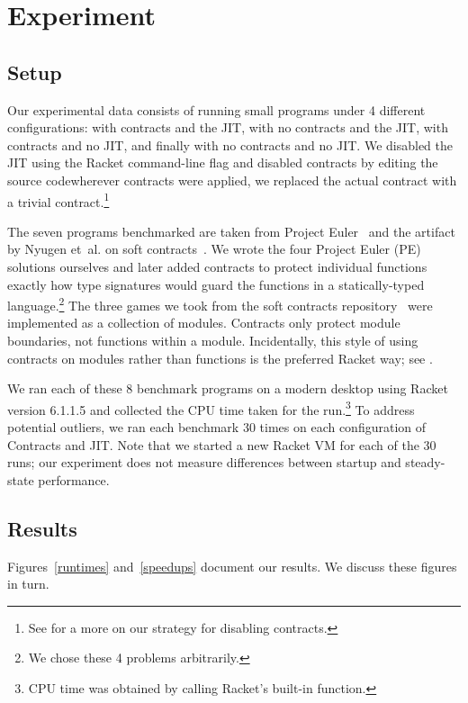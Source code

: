 \section{Experiment}
\label{experiment}
\subsection{Setup}
Our experimental data consists of running small programs under 4 different configurations: with contracts and the JIT, with no contracts and the JIT, with contracts and no JIT, and finally with no contracts and no JIT.
We disabled the JIT using the Racket command-line flag  and disabled contracts by editing the  source code\textemdash wherever contracts were applied, we replaced the actual contract with a trivial  contract.\footnote{See  for a more on our strategy for disabling contracts.}

The seven programs benchmarked are taken from Project Euler~\cite{project-euler} and the artifact by Nyugen et~al. on soft contracts~\cite{soft-contracts}.
We wrote the four Project Euler (PE) solutions ourselves and later added contracts to protect individual functions exactly how type signatures would guard the functions in a statically-typed language.\footnote{We chose these 4 problems arbitrarily.}
The three games we took from the soft contracts repository~\cite{soft-contracts-repo} were implemented as a collection of modules.
Contracts only protect module boundaries, not functions within a module.
Incidentally, this style of using contracts on modules rather than functions is the preferred Racket way; see .

We ran each of these 8 benchmark programs on a modern desktop using Racket version 6.1.1.5 and collected the CPU time taken for the run.\footnote{CPU time was obtained by calling Racket's built-in  function.}
To address potential outliers, we ran each benchmark 30 times on each configuration of Contracts and JIT.
Note that we started a new Racket VM for each of the 30 runs; our experiment does not measure differences between startup and steady-state performance.

\subsection{Results}
Figures~\ref{runtimes} and~\ref{speedups} document our results.
We discuss these figures in turn.


